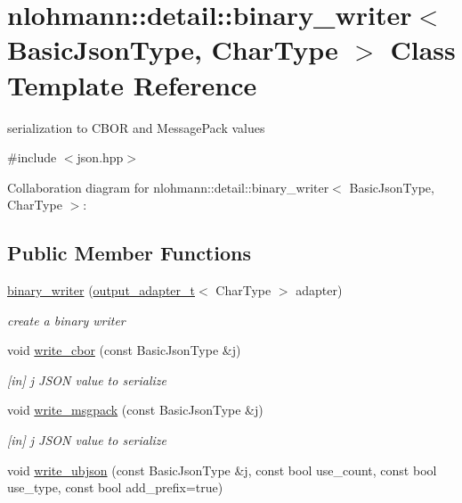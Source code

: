 \hypertarget{classnlohmann_1_1detail_1_1binary__writer}{}\section{nlohmann\+:\+:detail\+:\+:binary\+\_\+writer$<$ Basic\+Json\+Type, Char\+Type $>$ Class Template Reference}
\label{classnlohmann_1_1detail_1_1binary__writer}


serialization to C\+B\+OR and Message\+Pack values  




{\ttfamily \#include $<$json.\+hpp$>$}



Collaboration diagram for nlohmann\+:\+:detail\+:\+:binary\+\_\+writer$<$ Basic\+Json\+Type, Char\+Type $>$\+:
\subsection*{Public Member Functions}
\begin{DoxyCompactItemize}
\item 
\hyperlink{classnlohmann_1_1detail_1_1binary__writer_a373289af95a946c19bb4a58a5df71a78}{binary\+\_\+writer} (\hyperlink{namespacenlohmann_1_1detail_a9b680ddfb58f27eb53a67229447fc556}{output\+\_\+adapter\+\_\+t}$<$ Char\+Type $>$ adapter)
\begin{DoxyCompactList}\small\item\em create a binary writer \end{DoxyCompactList}\item 
void \hyperlink{classnlohmann_1_1detail_1_1binary__writer_aa0ab8d27fd88a33a2f801413ac4c7fbc}{write\+\_\+cbor} (const Basic\+Json\+Type \&j)
\begin{DoxyCompactList}\small\item\em \mbox{[}in\mbox{]} j J\+S\+ON value to serialize \end{DoxyCompactList}\item 
void \hyperlink{classnlohmann_1_1detail_1_1binary__writer_ae4e0852b64102ce4b07d99f08f828b7c}{write\+\_\+msgpack} (const Basic\+Json\+Type \&j)
\begin{DoxyCompactList}\small\item\em \mbox{[}in\mbox{]} j J\+S\+ON value to serialize \end{DoxyCompactList}\item 
void \hyperlink{classnlohmann_1_1detail_1_1binary__writer_a0f6c65053d859269f88eb4ebb0cd7060}{write\+\_\+ubjson} (const Basic\+Json\+Type \&j, const bool use\+\_\+count, const bool use\+\_\+type, const bool add\+\_\+prefix=true)
\end{DoxyCompactItemize}
